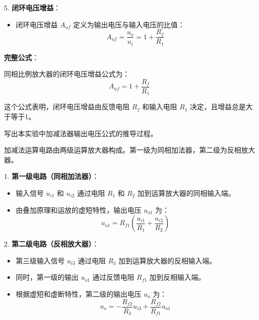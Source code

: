\documentclass[dvipsnames, svgnames,a4paper,11pt]{article}
\begin{document}
5. \textbf{闭环电压增益}：
    \begin{itemize}
        \item 闭环电压增益 \( A_{uf} \) 定义为输出电压与输入电压的比值：
        \begin{equation}
        A_{uf} = \frac{u_{o}}{u_{i}} = 1 + \frac{R_{f}}{R_{1}}
        \end{equation}
    \end{itemize}

\textbf{完整公式}：

同相比例放大器的闭环电压增益公式为：
\begin{equation}
A_{uf} = 1 + \frac{R_{f}}{R_{1}}
\end{equation}

这个公式表明，闭环电压增益由反馈电阻 \( R_{f} \) 和输入电阻 \( R_{1} \) 决定，且增益总是大于等于1。

	\begin{question}
		写出本实验中加减法器输出电压公式的推导过程。
	\end{question}
	加减法运算电路由两级运算放大器构成。第一级为同相加法器，第二级为反相放大器。



1. \textbf{第一级电路（同相加法器）}：
    \begin{itemize}
        \item 输入信号 \(u_{i1}\) 和 \(u_{i2}\) 通过电阻 \(R_{1}\) 和 \(R_{2}\) 加到运算放大器的同相输入端。
        \item 由叠加原理和运放的虚短特性，输出电压 \(u_{o1}\) 为：
        \begin{equation}
        u_{o1} = R_{f1} \left( \frac{u_{i1}}{R_{1}} + \frac{u_{i2}}{R_{2}} \right)
        \end{equation}
    \end{itemize}

2. \textbf{第二级电路（反相放大器）}：
    \begin{itemize}
        \item 第三级输入信号 \(u_{i3}\) 通过电阻 \(R_{3}\) 加到运算放大器的反相输入端。
        \item 同时，第一级的输出 \(u_{o1}\) 通过反馈电阻 \(R_{f1}\) 加到反相输入端。
        \item 根据虚短和虚断特性，第二级的输出电压 \(u_{o}\) 为：
        \begin{equation}
        u_{o} = -\frac{R_{f2}}{R_{3}} u_{i3} + \frac{R_{f2}}{R_{f1}} u_{o1}
        \end{equation}
    \end{itemize}
\end{document}
